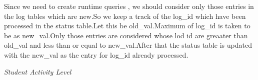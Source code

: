 \documentclass[a4paper,12pt,oneside]{sphinxmanual}
\begin{document}
\begin{DUlineblock}{0em}
\item[] Since we need to create runtime queries , we should consider only those entries in the log tables which are new.So we keep a track of the log\_id which have been processed in the status table.Let this be old\_val.Maximum of log\_id is taken to be as new\_val.Only those entries are considered whose lod id are greaater than old\_val and less than or equal to new\_val.After that the status table is updated with the new\_val as the entry for log\_id already processed.
\end{DUlineblock}

\emph{Student Activity Level}
\begin{figure}[htbp]
\centering

\end{figure}
\end{document}
